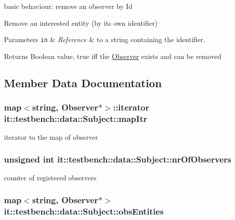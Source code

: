 basic behaviour\-: remove an observer by Id 

Remove an interested entity (by its own identifier)


\begin{DoxyParams}[1]{Parameters}
\mbox{\tt in}  & {\em Reference} & to a string containing the identifier. \\
\hline
\end{DoxyParams}
\begin{DoxyReturn}{Returns}
Boolean value, true iff the \hyperlink{classit_1_1testbench_1_1data_1_1Observer}{Observer} exists and can be removed 
\end{DoxyReturn}


\subsection{Member Data Documentation}
\hypertarget{classit_1_1testbench_1_1data_1_1Subject_aeaf7e15b328c3e389a3ef08d3aa378da}{
\subsubsection[{map\-Itr}]{\setlength{\rightskip}{0pt plus 5cm}map$<$string, {\bf Observer}$\ast$$>$\-::iterator it\-::testbench\-::data\-::\-Subject\-::map\-Itr\hspace{0.3cm}{\ttfamily [protected]}}}\label{d7/db8/classit_1_1testbench_1_1data_1_1Subject_aeaf7e15b328c3e389a3ef08d3aa378da}
iterator to the map of observer \hypertarget{classit_1_1testbench_1_1data_1_1Subject_a68eac3643bebb743398daf5ec0feca19}{
\subsubsection[{nr\-Of\-Observers}]{\setlength{\rightskip}{0pt plus 5cm}unsigned int it\-::testbench\-::data\-::\-Subject\-::nr\-Of\-Observers\hspace{0.3cm}{\ttfamily [protected]}}}\label{d7/db8/classit_1_1testbench_1_1data_1_1Subject_a68eac3643bebb743398daf5ec0feca19}
counter of registered observers \hypertarget{classit_1_1testbench_1_1data_1_1Subject_aa39fb7d11c7336c09eb7df8c29700da6}{
\subsubsection[{obs\-Entities}]{\setlength{\rightskip}{0pt plus 5cm}map$<$string, {\bf Observer}$\ast$$>$ it\-::testbench\-::data\-::\-Subject\-::obs\-Entities\hspace{0.3cm}{\ttfamily [protected]}}}\label{d7/db8/classit_1_1testbench_1_1data_1_1Subject_aa39fb7d11c7336c09eb7df8c29700da6}
